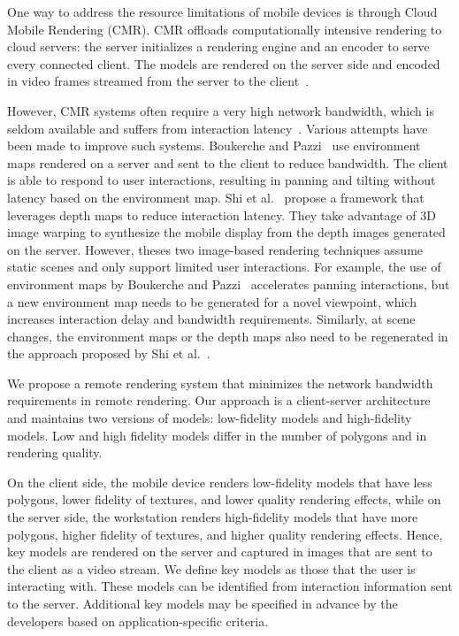 One way to address the resource limitations of mobile devices is through Cloud Mobile Rendering (CMR).
CMR offloads computationally intensive rendering to cloud servers:
the server initializes a rendering engine and an encoder to serve every connected client. The models are rendered on the server side and encoded in video frames streamed from the server to the client~\cite{lamberti2007,lu2011,ma2017,chang2004,simoens2012}.

However, CMR systems often require a very high network bandwidth, which is seldom available and suffers from interaction latency~\cite{chen2014}. Various attempts have been made to improve such systems. 
Boukerche and Pazzi~\cite{boukerche2006} use environment maps rendered on a server and sent to the client to reduce bandwidth. The client is able to respond to user interactions, resulting in panning and tilting without latency based on the environment map.
Shi et al.~\cite{shi2012} propose a framework that leverages depth maps to reduce interaction latency. They take advantage of 3D image warping to synthesize the mobile display from the depth images generated on the server.
However, theses two image-based rendering techniques assume static scenes and only support limited user interactions.
For example, the use of environment maps by Boukerche and Pazzi~\cite{boukerche2006} accelerates panning interactions, but a new environment map needs to be generated for a novel viewpoint, which increases interaction delay and bandwidth requirements. Similarly, at scene changes, the environment maps or the depth maps also need to be regenerated in the approach proposed by Shi et al.~\cite{shi2012}.

We propose a remote rendering system that minimizes the network bandwidth requirements in remote rendering.
Our approach is a client-server architecture and maintains two versions of models: low-fidelity models and high-fidelity models.
Low and high fidelity models differ in the number of polygons and in rendering quality.

On the client side, the mobile device renders low-fidelity models that have less polygons, lower fidelity of textures, and lower quality rendering effects, while on the server side, the workstation renders high-fidelity models that have more polygons, higher fidelity of textures, and higher quality rendering effects. Hence, key models are rendered on the server and captured in images that are sent to the client as a video stream. We define key models as those that the user is interacting with. These models can be identified from interaction information sent to the server. Additional key models may be specified in advance by the developers based on application-specific criteria.

